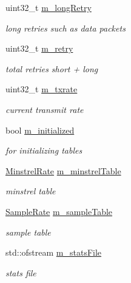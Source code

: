 \begin{DoxyCompactItemize}
uint32\+\_\+t \hyperlink{structns3_1_1MinstrelWifiRemoteStation_adee192fc860dc7ae9fe4cbe4e07322ec}{m\+\_\+long\+Retry}
\begin{DoxyCompactList}\small\item\em long retries such as data packets \end{DoxyCompactList}\item 
uint32\+\_\+t \hyperlink{structns3_1_1MinstrelWifiRemoteStation_a9f80718a2af71d31897ae0e7e6c50ada}{m\+\_\+retry}
\begin{DoxyCompactList}\small\item\em total retries short + long \end{DoxyCompactList}\item 
uint32\+\_\+t \hyperlink{structns3_1_1MinstrelWifiRemoteStation_af6c3b623281d34e7f9b2a22270f4aab9}{m\+\_\+txrate}
\begin{DoxyCompactList}\small\item\em current transmit rate \end{DoxyCompactList}\item 
bool \hyperlink{structns3_1_1MinstrelWifiRemoteStation_a430ab94b617c8be6ca686a06f631a025}{m\+\_\+initialized}
\begin{DoxyCompactList}\small\item\em for initializing tables \end{DoxyCompactList}\item 
\hyperlink{namespacens3_a1d11c59469e45dbecea190a2a547b181}{Minstrel\+Rate} \hyperlink{structns3_1_1MinstrelWifiRemoteStation_a8c33890de7ab95a96169542fd2b5a1cb}{m\+\_\+minstrel\+Table}
\begin{DoxyCompactList}\small\item\em minstrel table \end{DoxyCompactList}\item 
\hyperlink{namespacens3_a6f9a56ecdb723c09bd5ab4f3b57a5bb5}{Sample\+Rate} \hyperlink{structns3_1_1MinstrelWifiRemoteStation_ab8cfb8324723910001df122cc7f78a21}{m\+\_\+sample\+Table}
\begin{DoxyCompactList}\small\item\em sample table \end{DoxyCompactList}\item 
std\+::ofstream \hyperlink{structns3_1_1MinstrelWifiRemoteStation_ac52ac417681f001cf8fb329215ee935d}{m\+\_\+stats\+File}
\begin{DoxyCompactList}\small\item\em stats file \end{DoxyCompactList}\end{DoxyCompactItemize}
